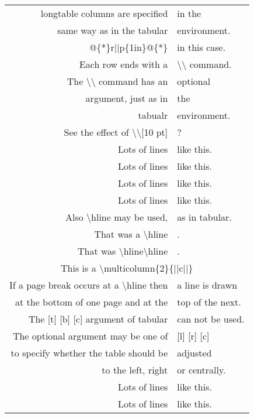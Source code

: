 ﻿\documentclass{article}
\begin{document}
\begin{longtable}{@{*}r||p{1in}@{*}}
    \textsf{longtable} columns are specified&in the\\
    same way as in the \textsf{tabular}&environment.\\
    \textsf{@\{*\}r||p\{1in\}@\{*\}}&in this case.\\
    Each row ends with a&\textsf{\textbackslash\textbackslash} command.\\
    The \textsf{\textbackslash\textbackslash} command has an&optional\\
    argument, just as in&the\\
    \textsf{tabualr}&environment.\\[10pt]
    See the effect of \textsf{\textbackslash\textbackslash[10 pt]}&?\\
    Lots of lines&like this.\\
    Lots of lines&like this.\\
    Lots of lines&like this.\\
    Lots of lines&like this.\\
    Also \textsf{\textbackslash{}hline} may be used,&as in \textsf{tabular}.\\
    \hline
    That was a \textsf{\textbackslash{}hline}&.\\
    \hline\hline
    That was \textsf{\textbackslash{}hline\textbackslash{}hline}&.\\
    \multicolumn{2}{||c||}{This is a \textsf{\textbackslash{}multicolumn\{2\}\{||c||\}}}\\
    If a page break occurs at a \textsf{\textbackslash{}hline} then&a line is drawn\\
    at the bottom of one page and at the&top of the next.\\
    \hline
    The \textsf{[t] [b] [c]} argument of \textsf{tabular}&can not be used.\\
    The optional argument may be one of&\textsf{[l] [r] [c]}\\
    to specify whether the table should be&adjusted\\
    to the left, right&or centrally.\\
    \hline\hline
    Lots of lines&like this.\\
    Lots of lines&like this.\\

\end{longtable}
\end{document}
